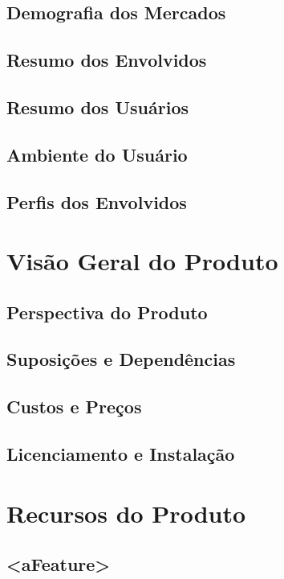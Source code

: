 \subsection{Demografia dos Mercados}

\subsection{Resumo dos Envolvidos}

\subsection{Resumo dos Usuários}

\subsection{Ambiente do Usuário}

\subsection{Perfis dos Envolvidos}

\section{Visão Geral do Produto}

\subsection{Perspectiva do Produto}

\subsection{Suposições e Dependências}

\subsection{Custos e Preços}

\subsection{Licenciamento e Instalação}

\section{Recursos do Produto}

\subsection{<aFeature>}

